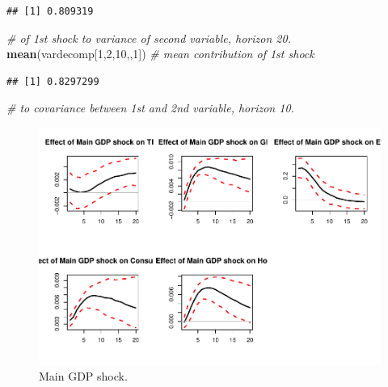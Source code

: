 \documentclass[
  12pt,
]{book}
\newenvironment{Shaded}{\begin{snugshade}}{\end{snugshade}}
\newcommand{\AttributeTok}[1]{\textcolor[rgb]{0.13,0.29,0.53}{#1}}
\newcommand{\CommentTok}[1]{\textcolor[rgb]{0.56,0.35,0.01}{\textit{#1}}}
\newcommand{\DecValTok}[1]{\textcolor[rgb]{0.00,0.00,0.81}{#1}}
\newcommand{\FunctionTok}[1]{\textcolor[rgb]{0.13,0.29,0.53}{\textbf{#1}}}
\newcommand{\NormalTok}[1]{#1}
\newcommand{\OtherTok}[1]{\textcolor[rgb]{0.56,0.35,0.01}{#1}}
\newcommand{\SpecialCharTok}[1]{\textcolor[rgb]{0.81,0.36,0.00}{\textbf{#1}}}
\theoremstyle{definition}
\theoremstyle{definition}
\theoremstyle{definition}
\theoremstyle{definition}
\theoremstyle{remark}
\begin{document}
\begin{Shaded}
\end{Shaded}

\begin{verbatim}
## [1] 0.809319
\end{verbatim}

\begin{Shaded}
\begin{Highlighting}[]
\CommentTok{\# of 1st shock to variance of second variable, horizon 20.}
\FunctionTok{mean}\NormalTok{(vardecomp[}\DecValTok{1}\NormalTok{,}\DecValTok{2}\NormalTok{,}\DecValTok{10}\NormalTok{,,}\DecValTok{1}\NormalTok{]) }\CommentTok{\# mean contribution of 1st shock }
\end{Highlighting}
\end{Shaded}

\begin{verbatim}
## [1] 0.8297299
\end{verbatim}

\begin{Shaded}
\begin{Highlighting}[]
\CommentTok{\# to covariance between 1st and 2nd variable, horizon 10.}
\end{Highlighting}
\end{Shaded}

\begin{figure}
\includegraphics[width=0.95\linewidth]{IdentifStructShocks_files/figure-latex/uhlig-1} \caption{Main GDP shock.}\label{fig:uhlig}
\end{figure}
\end{document}
